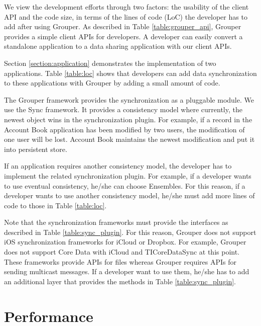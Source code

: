 \documentclass[a4paper,11pt]{report}
\begin{document}
We view the development efforts through two factors: the usability of the client API and the code size, in terms of the lines of code (LoC) the developer has to add after using Grouper. 
As described in Table \ref{table:grouper_api}, Grouper provides a simple client APIs for developers.
A developer can easily convert a standalone application to a data sharing application with our client APIs.

Section \ref{section:application} demonstrates the implementation of two applications.
Table \ref{table:loc} shows that developers can add data synchronization to these applications with Grouper by adding a small amount of code. 

The Grouper framework provides the synchronization as a pluggable module.
We use the Sync\cite{sync} framework.
It provides a consistency model where currently, the newest object wins in the synchronization plugin.
For example, if a record in the Account Book application has been modified by two users, the modification of one user will be lost.
Account Book maintains the newest modification and put it into persistent store.

If an application requires another consistency model, the developer has to implement the related synchronization plugin.
For example, if a developer wants to use eventual consistency, he/she can choose Ensembles\cite{ensembles}.
For this reason, if a developer wants to use another consistency model, he/she must add more lines of code to those in Table \ref{table:loc}.

Note that the synchronization frameworks must provide the interfaces as described in Table \ref{table:sync_plugin}.
For this reason, Grouper does not support iOS synchronization frameworks for iCloud or Dropbox.
For example, Grouper does not support Core Data with iCloud\cite{coredata} and TICoreDataSync\cite{ticoredatasyn} at this point.
These frameworks provide APIs for files whereas Grouper requires APIs for sending multicast messages.
If a developer want to use them, he/she has to add an additional layer that provides the methods in Table \ref{table:sync_plugin}.

\section{Performance} \label{section:performance}
\end{document}
